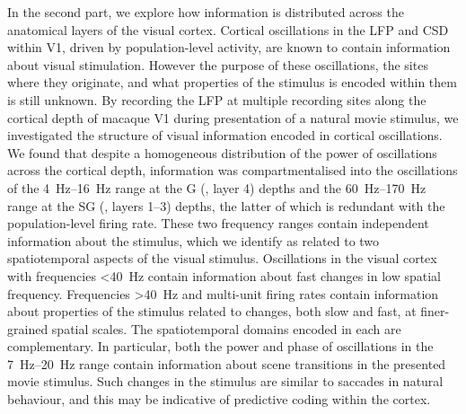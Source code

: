 In the second part, we explore how information is distributed across the anatomical layers of the visual cortex.
Cortical oscillations in the \acf{LFP} and \acf{CSD} within \acs{V1}, driven by population-level activity, are known to contain information about visual stimulation.
However the purpose of these oscillations, the sites where they originate, and what properties of the stimulus is encoded within them is still unknown.
By recording the \ac{LFP} at multiple recording sites along the cortical depth of macaque \acs{V1} during presentation of a natural movie stimulus, we investigated the structure of visual information encoded in cortical oscillations.
We found that despite a homogeneous distribution of the power of oscillations across the cortical depth, information was compartmentalised into the oscillations of the \SIrange{4}{16}{Hz} range at the \acl{G} (, layer 4) depths and the \SIrange{60}{170}{Hz} range at the \acl{SG} (, layers 1--3) depths, the latter of which is redundant with the population-level firing rate.
These two frequency ranges contain independent information about the stimulus, which we identify as related to two spatiotemporal aspects of the visual stimulus.
Oscillations in the visual cortex with frequencies \SI{<40}{Hz} contain information about fast changes in low spatial frequency.
Frequencies \SI{>40}{Hz} and multi-unit firing rates contain information about properties of the stimulus related to changes, both slow and fast, at finer-grained spatial scales.
The spatiotemporal domains encoded in each are complementary.
In particular, both the power and phase of oscillations in the \SIrange{7}{20}{Hz} range contain information about scene transitions in the presented movie stimulus.
Such changes in the stimulus are similar to saccades in natural behaviour, and this may be indicative of predictive coding within the cortex.


\endgroup			

\vfill
